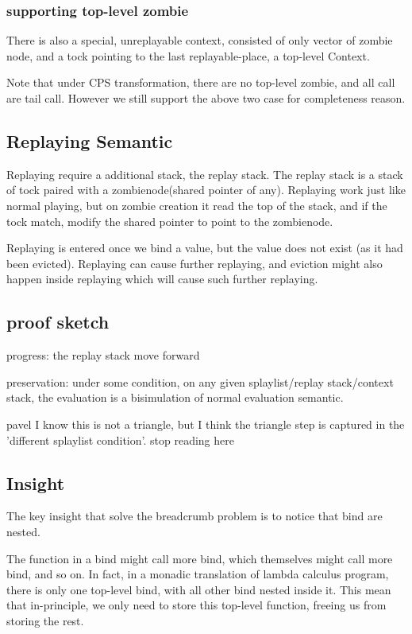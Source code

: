 \subsubsection{supporting top-level zombie}
There is also a special, unreplayable context, consisted of only vector of zombie node, and a tock pointing to the last replayable-place, a top-level Context.

Note that under CPS transformation, there are no top-level zombie, and all call are tail call. However we still support the above two case for completeness reason.
\subsection{Replaying Semantic}
Replaying require a additional stack, the replay stack. The replay stack is a stack of tock paired with a zombienode(shared pointer of any). Replaying work just like normal playing, but on zombie creation it read the top of the stack, and if the tock match, modify the shared pointer to point to the zombienode.

Replaying is entered once we bind a value, but the value does not exist (as it had been evicted). Replaying can cause further replaying, and eviction might also happen inside replaying which will cause such further replaying.

\subsection{proof sketch}
progress: the replay stack move forward

preservation: under some condition, on any given splaylist/replay stack/context stack, the evaluation is a bisimulation of normal evaluation semantic.

pavel I know this is not a triangle, but I think the triangle step is captured in the 'different splaylist condition'.
\pavel stop reading here

\subsection{Insight}
The key insight that solve the breadcrumb problem is to notice that bind are nested.

The function in a bind might call more bind, which themselves might call more bind, and so on. In fact, in a monadic translation of lambda calculus program, there is only one top-level bind, with all other bind nested inside it. This mean that in-principle, we only need to store this top-level function, freeing us from storing the rest.

